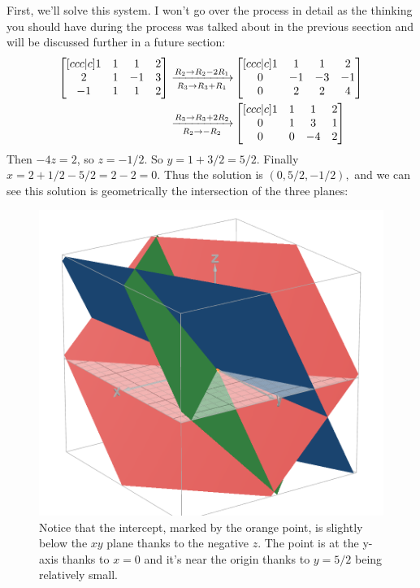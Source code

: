 \documentclass[12pt]{scrartcl}
\begin{document}
First, we'll solve this system. I won't go over the process in detail as the thinking you should have during the process was talked about in the previous seection and will be discussed further in a future section:
\begin{align*}
    \begin{bmatrix}[ccc|c]
       1 & 1 & 1 & 2 \\
       2 & 1 & -1 & 3 \\
       -1 & 1 & 1 & 2 
    \end{bmatrix}
    \xto[R_2 \to R_2 - 2R_1][R_3 \to R_3 + R_1]&
    \begin{bmatrix}[ccc|c]
        1 & 1 & 1 & 2 \\
        0 & -1 & -3 & -1 \\
        0 & 2 & 2 & 4
    \end{bmatrix} \\
    \xto[R_3 \to R_3 + 2R_2][R_2 \to -R_2]&
    \begin{bmatrix}[ccc|c]
        1 & 1 & 1 & 2 \\
        0 & 1 & 3 & 1 \\
        0 & 0 & -4 & 2
    \end{bmatrix}
\end{align*}
Then $-4z = 2$, so $z = -1/2.$ So $y = 1 + 3/2 = 5/2.$ Finally $x = 2 + 1/2 - 5/2 = 2 - 2 = 0$. Thus the solution is $(0, 5/2, -1/2),$ and we can see this solution is geometrically the intersection of the three planes:

\begin{figure}[H]
    \centering
    \includegraphics[scale=0.4]{Another Intercept of Three Planes.png}
    \caption*{Notice that the intercept, marked by the orange point, is slightly below the $xy$ plane thanks to the negative $z$. The point is at the y-axis thanks to $x=0$ and it's near the origin thanks to $y = 5/2$ being relatively small.}
\end{figure}
\end{document}
